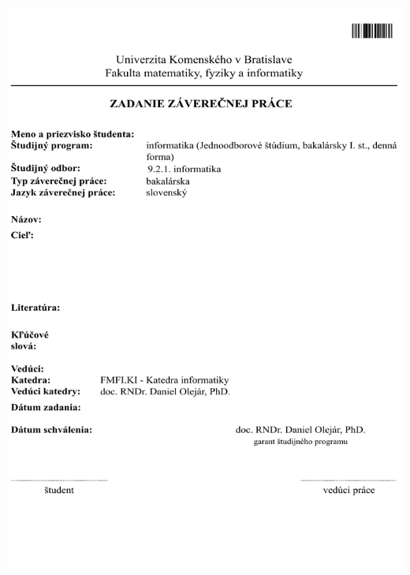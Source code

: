 \documentclass[12pt, oneside]{book}
\begin{document}
\newpage 
\thispagestyle{empty}
\hspace{-2cm}\includegraphics[width=1.1\textwidth]{images/zadanie}


\frontmatter

\setcounter{page}{3}
\newpage 
~
\end{document}
